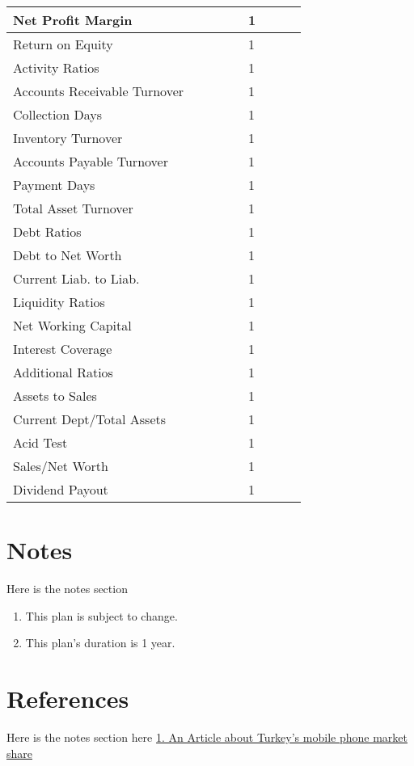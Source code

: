 \documentclass[11pt]{article}
\begin{document}
\begin{landscape}
\begin{scriptsize}
\begin{tabular}{ | l | l | l | l | l | l | l | l | l |}
  Net Profit Margin & & & & & 1 \\ \hline
  Return on Equity & & & & & 1 \\ \hline
  Activity Ratios & & & & & 1 \\ \hline
  Accounts Receivable Turnover & & & & & 1 \\ \hline
  Collection Days & & & & & 1 \\ \hline
  Inventory Turnover & & & & & 1 \\ \hline
  Accounts Payable Turnover & & & & & 1 \\ \hline
  Payment Days & & & & & 1 \\ \hline
  Total Asset Turnover & & & & & 1 \\ \hline
  Debt Ratios & & & & & 1 \\ \hline
  Debt to Net Worth & & & & & 1 \\ \hline
  Current Liab. to Liab. & & & & & 1 \\ \hline
  Liquidity Ratios & & & & & 1 \\ \hline
  Net Working Capital & & & & & 1 \\ \hline
  Interest Coverage & & & & & 1 \\ \hline
  Additional Ratios & & & & & 1 \\ \hline
  Assets to Sales & & & & & 1 \\ \hline
  Current Dept/Total Assets & & & & & 1 \\ \hline
  Acid Test & & & & & 1 \\ \hline
  Sales/Net Worth & & & & & 1 \\ \hline
  Dividend Payout & & & & & 1 \\ \hline
\end{tabular}
\end{scriptsize}
\end{landscape}

\pagebreak

\section{Notes}
Here is the notes section
\begin{enumerate}
\item This plan is subject to change.
\item This plan's duration is 1 year.
\end{enumerate}

\section{References}
Here is the notes section\newline
\hypertarget{market_share}{here}\newline
\href{http://http://sayarbilgi.net/mobil-aygitlar/7-mobil-aygit-haberleri/88-turkiyenin-en-cok-satan-cep-telefonlari.html}{1. An Article about Turkey's mobile phone market share}
\end{document}
